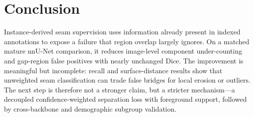 \section{Conclusion}

Instance-derived seam supervision uses information already present in indexed annotations to expose a failure that region overlap largely ignores. On a matched mature nnU-Net comparison, it reduces image-level component under-counting and gap-region false positives with nearly unchanged Dice. The improvement is meaningful but incomplete: recall and surface-distance results show that unweighted seam classification can trade false bridges for local erosion or outliers. The next step is therefore not a stronger claim, but a stricter mechanism---a decoupled confidence-weighted separation loss with foreground support, followed by cross-backbone and demographic subgroup validation.
